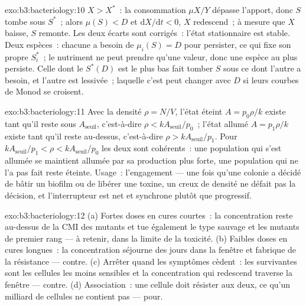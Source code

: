 \begin{solution}{exo:b3:bacteriology:10}
$X > X^{*}$~: la consommation $\mu X/Y$ dépasse l'apport, donc $S$
tombe sous $S^{*}$~; alors $\mu(S) < D$ et
$\mathrm{d}X/\mathrm{d}t < 0$, $X$ redescend~; à mesure que $X$ baisse,
$S$ remonte. Les deux écarts sont corrigés~: l'état stationnaire est
stable. Deux espèces~: chacune a besoin de $\mu_{i}(S) = D$ pour
persister, ce qui fixe son propre $S_{i}^{*}$~; le nutriment ne peut
prendre qu'une valeur, donc une espèce au plus persiste. Celle dont le
$S^{*}(D)$ est le plus bas fait tomber $S$ sous ce dont l'autre a
besoin, et l'autre est lessivée~; laquelle c'est peut changer avec $D$
si leurs courbes de Monod se croisent.
\end{solution}

\begin{solution}{exo:b3:bacteriology:11}
Avec la densité $\rho = N/V$, l'état éteint $A = p_{0}\rho/k$ existe
tant qu'il reste sous $A_{\text{seuil}}$, c'est-à-dire
$\rho < kA_{\text{seuil}}/p_{0}$~; l'état allumé $A = p_{1}\rho/k$ existe tant
qu'il reste au-dessus, c'est-à-dire $\rho
> kA_{\text{seuil}}/p_{1}$. Pour $kA_{\text{seuil}}/p_{1} < \rho <
kA_{\text{seuil}}/p_{0}$ les deux sont cohérents~: une population qui
s'est allumée se maintient allumée par sa production plus forte, une
population qui ne l'a pas fait reste éteinte. Usage~: l'engagement ---
une fois qu'une colonie a décidé de bâtir un biofilm ou de libérer une
toxine, un creux de densité ne défait pas la décision, et
l'interrupteur est net et synchrone plutôt que progressif.
\end{solution}

\begin{solution}{exo:b3:bacteriology:12}
(a) Fortes doses en cures courtes~: la concentration reste au-dessus de
la CMI des mutants et tue également le type sauvage et les mutants de
premier rang --- à retenir, dans la limite de la toxicité. (b) Faibles
doses en cures longues~: la concentration séjourne des jours dans la
fenêtre et fabrique de la résistance --- contre. (c) Arrêter quand les
symptômes cèdent~: les survivantes sont les cellules les moins
sensibles et la concentration qui redescend traverse la fenêtre ---
contre. (d) Association~: une cellule doit résister aux deux, ce qu'un
milliard de cellules ne contient pas --- pour.
\end{solution}

